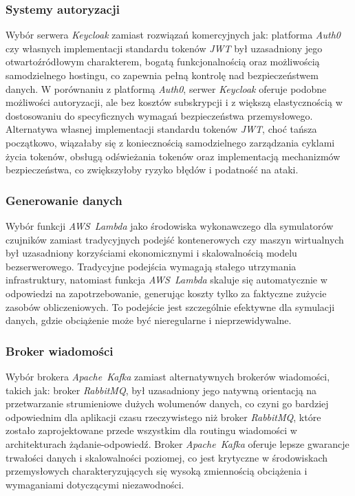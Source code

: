 \subsubsection{Systemy autoryzacji}

Wybór serwera \textit{\mbox{Keycloak}} \cite{keycloak_docs} zamiast rozwiązań komercyjnych jak: platforma \textit{\mbox{Auth0}} czy własnych implementacji standardu tokenów \textit{\mbox{JWT}} \cite{jwt_rfc} był uzasadniony jego otwartoźródłowym charakterem, bogatą funkcjonalnością oraz możliwością samodzielnego hostingu, co zapewnia pełną kontrolę nad bezpieczeństwem danych. W porównaniu z platformą \textit{\mbox{Auth0}}, serwer \textit{\mbox{Keycloak}} oferuje podobne możliwości autoryzacji, ale bez kosztów subskrypcji i z większą elastycznością w dostosowaniu do specyficznych wymagań bezpieczeństwa przemysłowego. Alternatywa własnej implementacji standardu tokenów \textit{\mbox{JWT}}, choć tańsza początkowo, wiązałaby się z koniecznością samodzielnego zarządzania cyklami życia tokenów, obsługą odświeżania tokenów oraz implementacją mechanizmów bezpieczeństwa, co zwiększyłoby ryzyko błędów i podatność na ataki.

\subsubsection{Generowanie danych}

Wybór funkcji \textit{\mbox{AWS Lambda}} \cite{aws_lambda_docs} jako środowiska wykonawczego dla symulatorów czujników zamiast tradycyjnych podejść kontenerowych czy maszyn wirtualnych był uzasadniony korzyściami ekonomicznymi i skalowalnością modelu bezserwerowego. Tradycyjne podejścia wymagają stałego utrzymania infrastruktury, natomiast funkcja \textit{\mbox{AWS Lambda}} skaluje się automatycznie w odpowiedzi na zapotrzebowanie, generując koszty tylko za faktyczne zużycie zasobów obliczeniowych. To podejście jest szczególnie efektywne dla symulacji danych, gdzie obciążenie może być nieregularne i nieprzewidywalne.

\subsubsection{Broker wiadomości}

Wybór brokera \textit{\mbox{Apache Kafka}} \cite{kafka} zamiast alternatywnych brokerów wiadomości, takich jak: broker \textit{\mbox{RabbitMQ}}, był uzasadniony jego natywną orientacją na przetwarzanie strumieniowe dużych wolumenów danych, co czyni go bardziej odpowiednim dla aplikacji czasu rzeczywistego niż broker \textit{\mbox{RabbitMQ}}, które zostało zaprojektowane przede wszystkim dla routingu wiadomości w architekturach żądanie-odpowiedź.  Broker \textit{\mbox{Apache Kafka}} oferuje lepsze gwarancje trwałości danych i skalowalności poziomej, co jest krytyczne w środowiskach przemysłowych charakteryzujących się wysoką zmiennością obciążenia i wymaganiami dotyczącymi niezawodności.
